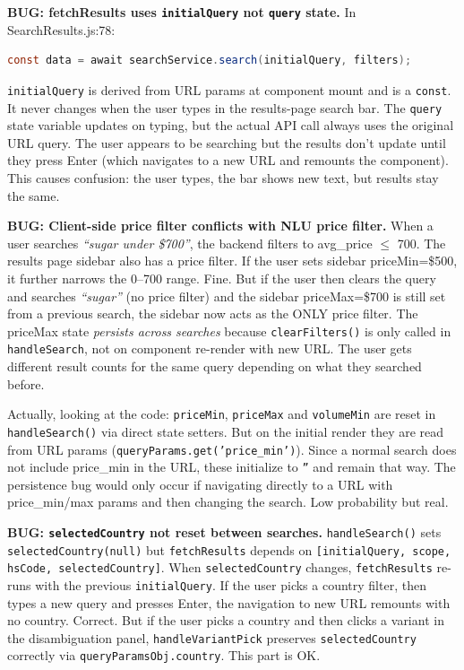 \documentclass[12pt,a4paper]{article}
\begin{document}
\begin{issueBox}
\textbf{BUG: fetchResults uses \texttt{initialQuery} not \texttt{query} state.}
In SearchResults.js:78:
\begin{lstlisting}[language=Java]
const data = await searchService.search(initialQuery, filters);
\end{lstlisting}
\texttt{initialQuery} is derived from URL params at component mount and is a \texttt{const}.
It never changes when the user types in the results-page search bar. The \texttt{query}
state variable updates on typing, but the actual API call always uses the original
URL query. The user appears to be searching but the results don't update until they
press Enter (which navigates to a new URL and remounts the component). This causes
confusion: the user types, the bar shows new text, but results stay the same.
\end{issueBox}

\begin{issueBox}
\textbf{BUG: Client-side price filter conflicts with NLU price filter.}
When a user searches \textit{``sugar under \$700''}, the backend filters to
avg\_price $\leq$ 700. The results page sidebar also has a price filter. If the user
sets sidebar priceMin=\$500, it further narrows the 0--700 range. Fine.
But if the user then clears the query and searches \textit{``sugar''} (no price filter)
and the sidebar priceMax=\$700 is still set from a previous search, the sidebar now
acts as the ONLY price filter. The priceMax state \textit{persists across searches}
because \texttt{clearFilters()} is only called in \texttt{handleSearch}, not on component
re-render with new URL. The user gets different result counts for the same query
depending on what they searched before.

Actually, looking at the code: \texttt{priceMin}, \texttt{priceMax} and \texttt{volumeMin}
are reset in \texttt{handleSearch()} via direct state setters. But on the initial render
they are read from URL params (\texttt{queryParams.get('price\_min')}). Since a normal
search does not include price\_min in the URL, these initialize to \texttt{''} and remain
that way. The persistence bug would only occur if navigating directly to a URL with
price\_min/max params and then changing the search. Low probability but real.
\end{issueBox}

\begin{issueBox}
\textbf{BUG: \texttt{selectedCountry} not reset between searches.}
\texttt{handleSearch()} sets \texttt{selectedCountry(null)} but \texttt{fetchResults}
depends on \texttt{[initialQuery, scope, hsCode, selectedCountry]}. When
\texttt{selectedCountry} changes, \texttt{fetchResults} re-runs with the previous
\texttt{initialQuery}. If the user picks a country filter, then types a new query and
presses Enter, the navigation to new URL remounts with no country. Correct.
But if the user picks a country and then clicks a variant in the disambiguation panel,
\texttt{handleVariantPick} preserves \texttt{selectedCountry} correctly via
\texttt{queryParamsObj.country}. This part is OK.
\end{issueBox}
\end{document}

